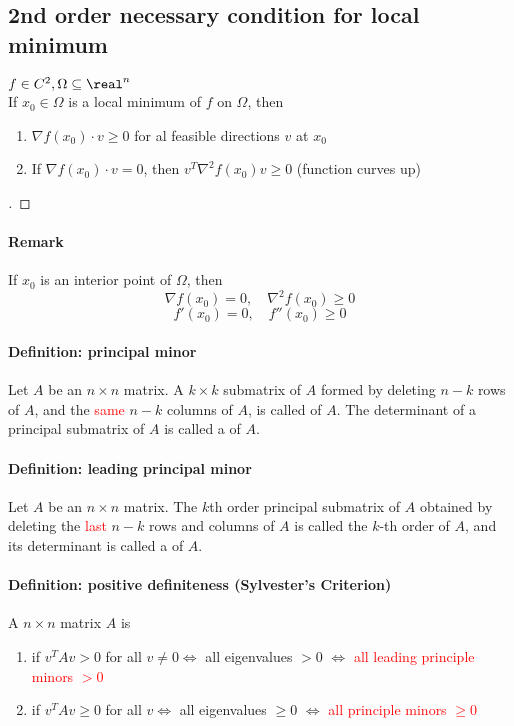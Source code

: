 \documentclass[11pt]{article}
\begin{document}
\subsection{2nd order necessary condition for local minimum}
$f \in C^2, \Omega \subseteq \real^n$ \\
If $x_0 \in \Omega$ is a local minimum of $f$ on $\Omega$, then
\begin{enumerate}
	\item $\nabla f(x_0) \cdot v \geq 0$ for al feasible directions $v$ at $x_0$
	\item If $\nabla f(x_0) \cdot v = 0$, then $v^T \nabla^2 f(x_0) v \geq 0$
	(function curves up)
\end{enumerate}
\begin{proof}
[]
\end{proof}

\paragraph{Remark}
If $x_0$ is an interior point of $\Omega$, then
$$\nabla f(x_0) = 0, \quad \nabla^2 f(x_0)\geq 0$$
$$f'(x_0) = 0, \quad f''(x_0) \geq 0$$

\paragraph{Definition: principal minor}
Let $A$ be an $n \times n$ matrix. A $k \times k$ submatrix of $A$ formed by deleting $n-k$ rows of $A$, and the \textcolor{red}{same} $n - k$ columns of $A$, is called  of $A$. The determinant of a principal submatrix of $A$ is called a  of $A$.

\paragraph{Definition: leading principal minor}
Let $A$ be an $n \times n$ matrix. The $k$th order principal submatrix of $A$ obtained by deleting the \textcolor{red}{last} $n-k$ rows and columns of $A$ is called the $k$-th order  of $A$, and its determinant is called a  of $A$.

\paragraph{Definition: positive definiteness (Sylvester's Criterion)}
A $n \times n$ matrix $A$ is \\
\begin{enumerate}
	\item {} if $v^TAv > 0$ for all $v \neq 0 \iff $ all eigenvalues $>0$ $\iff$ \textcolor{red}{all leading principle minors $> 0$}
	\item {} if $v^TAv \geq 0$ for all $v \iff $ all eigenvalues $\geq 0$ $\iff$ \textcolor{red}{all principle minors $\geq 0$}
\end{enumerate}
\end{document}
